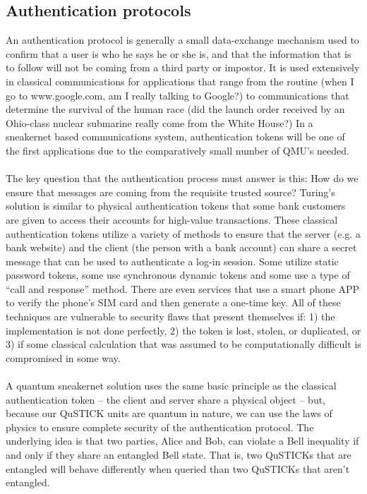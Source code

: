 \documentclass[aps,prl,twocolumn,10pt,nofootinbib]{revtex4}
\begin{document}
\subsection{Authentication protocols}
An authentication protocol is generally a small data-exchange mechanism used to confirm that a user is who he says he or she is, and that the information that is to follow will not be coming from a third party or impostor.  It is used extensively in classical communications for applications that range from the routine (when I go to www.google.com, am I really talking to Google?) to communications that determine the survival of the human race (did the launch order received by an Ohio-class nuclear submarine really come from the White House?)  In a sneakernet based communications system, authentication tokens will be one of the first applications due to the comparatively small number of QMU's needed.  
\\
\\
The key question that the authentication process must answer is this: How do we ensure that messages are coming from the requisite trusted source?  Turing's solution is similar to physical authentication tokens that some bank customers are given to access their  accounts for high-value transactions.  These classical authentication tokens utilize a variety of methods to ensure that the server (e.g. a bank website) and the client (the person with a bank account) can share a secret message that can be used to authenticate a log-in session.  Some utilize static password tokens, some use synchronous dynamic tokens and some use a type of ``call and response'' method.  There are even services that use a smart phone APP to verify the phone's SIM card and then generate a one-time key.  All of these techniques are vulnerable to security flaws that present themselves if: 1) the implementation is not done perfectly, 2) the token is lost, stolen, or duplicated, or 3) if some classical calculation that was assumed to be computationally difficult is compromised in some way.  
\\
\\
A quantum sneakernet solution uses the same basic principle as the classical authentication token -- the client and server share a physical object -- but, because our QuSTICK units are quantum in nature, we can use the  laws of physics to ensure complete security of the authentication protocol. The underlying idea is that two parties, Alice and Bob, can violate a Bell inequality if and only if they share an entangled Bell state.  That is, two QuSTICKs that are entangled will behave differently when queried than two QuSTICKs that aren't entangled.
\end{document}
